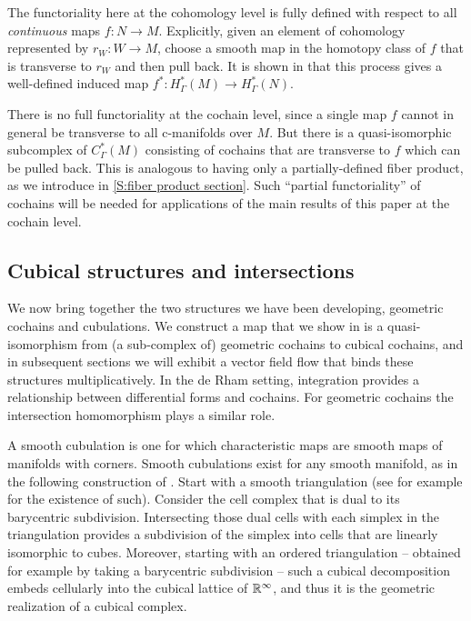 The functoriality here at the cohomology level is fully defined with respect to all \textit{continuous} maps $f \colon N \to M$.
Explicitly, given an element of cohomology represented by $r_W \colon W \to M$, choose a smooth map in the homotopy class of $f$ that is transverse to $r_W$ and then pull back.
It is shown in \cite[Proposition 5.16]{medina2022foundations} that this process gives a well-defined induced map $f^* \colon H^*_\Gamma(M) \to H^*_\Gamma(N)$.

There is no full functoriality at the cochain level, since a single map $f$ cannot in general be transverse to all c-manifolds over $M$.
But there is a quasi-isomorphic subcomplex of $C_\Gamma^*(M)$ consisting of cochains that are transverse to $f$ which can be pulled back.
This is analogous to having only a partially-defined fiber product, as we introduce in \cref{S:fiber product section}.
Such ``partial functoriality'' of cochains will be needed for applications of the main results of this paper at the cochain level.

\subsection{Cubical structures and intersections}

We now bring together the two structures we have been developing, geometric cochains and cubulations.
We construct a map that we show in \cite{medina2022foundations} is a quasi-isomorphism from (a sub-complex of) geometric cochains to cubical cochains, and in subsequent sections we will exhibit a vector field flow that binds these structures multiplicatively.
In the de Rham setting, integration provides a relationship between differential forms and cochains.
For geometric cochains the intersection homomorphism plays a similar role.

A smooth cubulation is one for which characteristic maps are smooth maps of manifolds with corners.
Smooth cubulations exist for any smooth manifold, as in the following construction of \cite{ShSh92}.
Start with a smooth triangulation (see for example \cite[Theorem 10.6]{Munk66} for the existence of such).
Consider the cell complex that is dual to its barycentric subdivision.
Intersecting those dual cells with each simplex in the triangulation provides a subdivision of the simplex into cells that are linearly isomorphic to cubes.
Moreover, starting with an ordered triangulation -- obtained for example by taking a barycentric subdivision -- such a cubical decomposition embeds cellularly into the cubical lattice of $\mathbb{R}^\infty$, and thus it is the geometric realization of a cubical complex.

